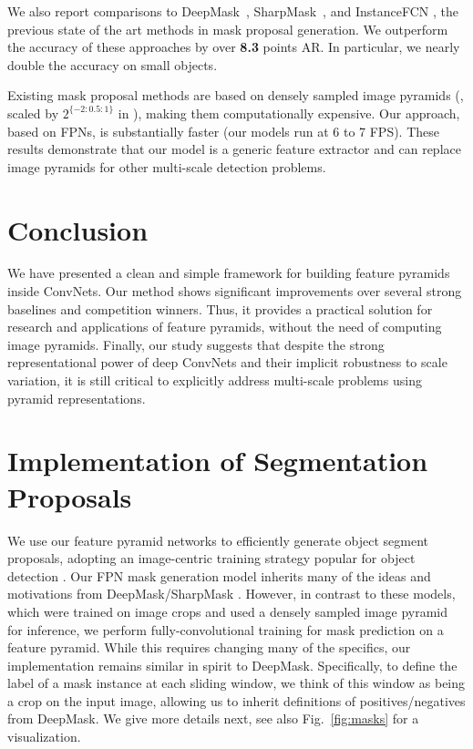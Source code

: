 \documentclass[10pt,twocolumn,letterpaper]{article}
\newcommand{\bd}[1]{\textbf{#1}}
\begin{document}
We also report comparisons to DeepMask~\cite{Pinheiro2015}, SharpMask~\cite{Pinheiro2016}, and InstanceFCN \cite{Dai2016a}, the previous state of the art methods in mask proposal generation.
We outperform the accuracy of these approaches by over \bd{8.3} points AR.
In particular, we nearly double the accuracy on small objects.

Existing mask proposal methods \cite{Pinheiro2015,Pinheiro2016,Dai2016a} are based on densely sampled image pyramids (\eg, scaled by $2^{\{-2:0.5:1\}}$ in \cite{Pinheiro2015,Pinheiro2016}), making them computationally expensive.
Our approach, based on FPNs, is substantially faster (our models run at 6 to 7 FPS).
These results demonstrate that our model is a generic feature extractor and can replace image pyramids for other multi-scale detection problems.

\section{Conclusion}

We have presented a clean and simple framework for building feature pyramids inside ConvNets.
Our method shows significant improvements over several strong baselines and competition winners.
Thus, it provides a practical solution for research and applications of feature pyramids, without the need of computing image pyramids.
Finally, our study suggests that despite the strong representational power of deep ConvNets and their implicit robustness to scale variation, it is still critical to explicitly address multi-scale problems using pyramid representations.

\appendix

\section{Implementation of Segmentation Proposals}

We use our feature pyramid networks to efficiently generate object segment proposals, adopting an image-centric training strategy popular for object detection \cite{Girshick2015a,Ren2015a}. Our FPN mask generation model inherits many of the ideas and motivations from DeepMask/SharpMask \cite{Pinheiro2015,Pinheiro2016}. However, in contrast to these models, which were trained on image crops and used a densely sampled image pyramid for inference, we perform fully-convolutional training for mask prediction on a feature pyramid. While this requires changing many of the specifics, our implementation remains similar in spirit to DeepMask.
Specifically, to define the label of a mask instance at each sliding window, we think of this window as being a crop on the input image, allowing us to inherit definitions of positives/negatives from DeepMask.
We give more details next, see also Fig.~\ref{fig:masks} for a visualization.
\end{document}

